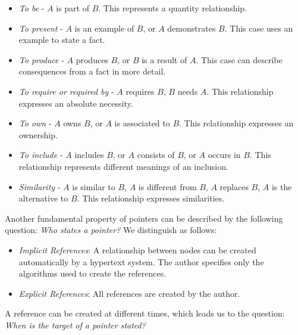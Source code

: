\begin{multicols}{2}
	\begin{itemize}
		\item \textit{To be} - $ A $ is part of $ B $. This represents a quantity relationship.
		\item \textit{To present} - $ A $ is an example of $ B $, or $ A $ demonstrates $ B $. This case uses an example to state a fact.
		\item \textit{To produce} - $ A $ produces $ B $, or $ B $ is a result of $ A $. This case can describe consequences from a fact in more detail.
		\item \textit{To require or required by} - $ A $ requires $ B $, $ B $ needs $ A $. This relationship expresses
		an absolute necessity.
		\item \textit{To own} - $ A $ owns $ B $, or $ A $ is associated to $ B $. This relationship expresses an ownership.
		\item \textit{To include} - $ A $ includes $ B $, or $ A $ consists of $ B $, or $ A $ occurs in $ B $. This relationship
		represents different meanings of an inclusion.
		\item \textit{Similarity} - $ A $ is similar to $ B $, $ A $ is different from $ B $, $ A $ replaces $ B $, $ A $ is the alternative to $ B $. This relationship expresses similarities.
	\end{itemize}
	
\end{multicols}

Another fundamental property of pointers can be described by the following question: \textit{Who states a pointer?} We distinguish as follows:
\begin{multicols}{2}
	\begin{itemize}
		\item \textit{Implicit References}: A relationship between nodes can be created automatically by a hypertext system. The author specifies only the algorithms used to create the references. 
		
		\item \textit{Explicit References}: All references are created by the author.
	\end{itemize}
\end{multicols}


A reference can be created at different times, which leads us to the question: \textit{When is the target of a pointer stated?}

